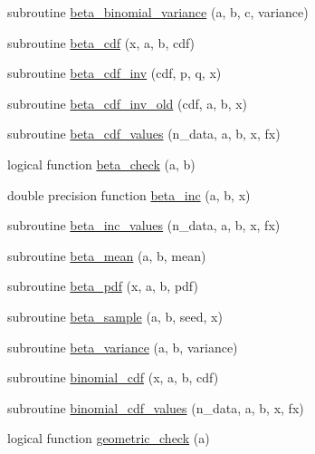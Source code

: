 \begin{DoxyCompactItemize}
\item 
subroutine \hyperlink{_bhabha__fortran__sem__doxy_8f_af18db84101609c96170537b5e09fab18}{beta\+\_\+binomial\+\_\+variance} (a, b, c, variance)
\item 
subroutine \hyperlink{_bhabha__fortran__sem__doxy_8f_a1307bf242705ab2dc0a8db7fc66f4128}{beta\+\_\+cdf} (x, a, b, cdf)
\item 
subroutine \hyperlink{_bhabha__fortran__sem__doxy_8f_ad7b9df743251c691af6f3c722fc44a70}{beta\+\_\+cdf\+\_\+inv} (cdf, p, q, x)
\item 
subroutine \hyperlink{_bhabha__fortran__sem__doxy_8f_a809c02d9b3e29e164a314e6b82989080}{beta\+\_\+cdf\+\_\+inv\+\_\+old} (cdf, a, b, x)
\item 
subroutine \hyperlink{_bhabha__fortran__sem__doxy_8f_a6ca4d09928ee56be09ca34c70fbc37ce}{beta\+\_\+cdf\+\_\+values} (n\+\_\+data, a, b, x, fx)
\item 
logical function \hyperlink{_bhabha__fortran__sem__doxy_8f_a006a8a482ef44095ae5e65425badff73}{beta\+\_\+check} (a, b)
\item 
double precision function \hyperlink{_bhabha__fortran__sem__doxy_8f_a2184970d382ccfa52654d945934a5db9}{beta\+\_\+inc} (a, b, x)
\item 
subroutine \hyperlink{_bhabha__fortran__sem__doxy_8f_ad6f95398deb212fed550fff77fee8aa7}{beta\+\_\+inc\+\_\+values} (n\+\_\+data, a, b, x, fx)
\item 
subroutine \hyperlink{_bhabha__fortran__sem__doxy_8f_a27758be0991a382242cea8fd6d1c6062}{beta\+\_\+mean} (a, b, mean)
\item 
subroutine \hyperlink{_bhabha__fortran__sem__doxy_8f_a98e50467dd638445b02798a39288af88}{beta\+\_\+pdf} (x, a, b, pdf)
\item 
subroutine \hyperlink{_bhabha__fortran__sem__doxy_8f_a4c2f42901cceca59466dde111153a465}{beta\+\_\+sample} (a, b, seed, x)
\item 
subroutine \hyperlink{_bhabha__fortran__sem__doxy_8f_a646b52af6a87a1f9ad45365d12e84074}{beta\+\_\+variance} (a, b, variance)
\item 
subroutine \hyperlink{_bhabha__fortran__sem__doxy_8f_af7299d3fda796eea9a1be0c256f1624b}{binomial\+\_\+cdf} (x, a, b, cdf)
\item 
subroutine \hyperlink{_bhabha__fortran__sem__doxy_8f_a8f4f3c2c05b8593455672a09762700d8}{binomial\+\_\+cdf\+\_\+values} (n\+\_\+data, a, b, x, fx)
\item 
logical function \hyperlink{_bhabha__fortran__sem__doxy_8f_a5a9de1b5360cf06f54e5c25a475a9f34}{geometric\+\_\+check} (a)

\end{DoxyCompactItemize}
